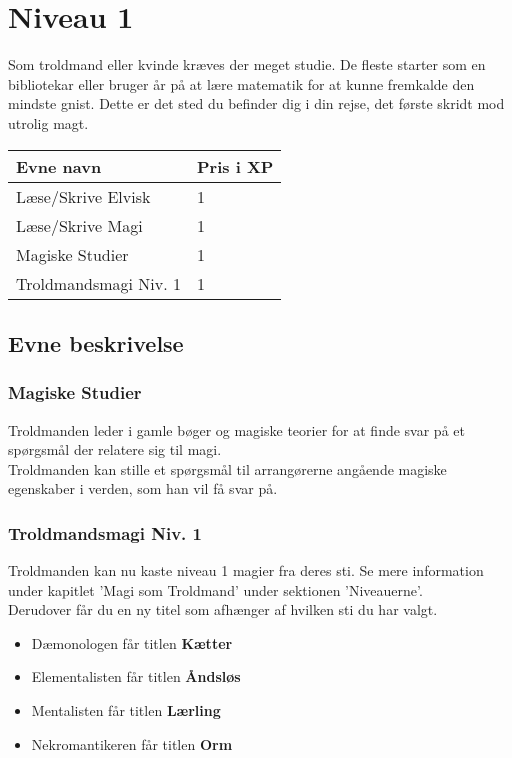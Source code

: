 \chapter*{Niveau 1}
Som troldmand eller kvinde kræves der meget studie. De fleste starter som en bibliotekar eller bruger år på at lære matematik for at kunne fremkalde den mindste gnist. Dette er det sted du befinder dig i din rejse, det første skridt mod utrolig magt. 

\begin{table}[H]
    \centering
    \begin{tabular}{|p{}|p{}|}
    \rowcolor{cerulean!80}\hline
        Evne navn & Pris i XP \\\hline
        Læse/Skrive Elvisk & 1\\\hline
        Læse/Skrive Magi & 1\\\hline
        Magiske Studier & 1\\\hline
        Troldmandsmagi Niv. 1 & 1\\\hline
    \end{tabular}
\end{table}

\section*{Evne beskrivelse}





\subsection*{Magiske Studier}
Troldmanden leder i gamle bøger og magiske teorier for at finde svar på et spørgsmål der relatere sig til magi.\\
Troldmanden kan stille et spørgsmål til arrangørerne angående magiske egenskaber i verden, som han vil få svar på.

\subsection*{Troldmandsmagi Niv. 1}
Troldmanden kan nu kaste niveau 1 magier fra deres sti. Se mere information under kapitlet 'Magi som Troldmand' under sektionen 'Niveauerne'. \\
Derudover får du en ny titel som afhænger af hvilken sti du har valgt.\\
\begin{itemize}
    \item Dæmonologen får titlen \textbf{Kætter}
    \item Elementalisten får titlen \textbf{Åndsløs}
    \item Mentalisten får titlen \textbf{Lærling}
    \item Nekromantikeren får titlen \textbf{Orm}
\end{itemize}